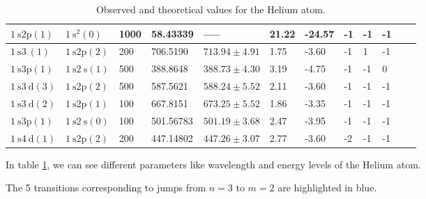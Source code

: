 \begin{table}
\begin{adjustwidth}{-1cm}{-1cm}
\begin{adjustbox}{width=1.75\textwidth, center}
\begin{tabular}{|l|l|l|l|l|l|l|l|l|l|l|l|}
                \hline $1 \mathrm{~s} 2 \mathrm{p}(1)$                      & $1 \mathrm{~s}^2(0)$             & 1000               & 58.43339                                  & -----                            & 21.22                         & -24.57                        & -1                 & -1                 & -1 \\
                \hline \cellcolor{blue!25} $1 \mathrm{~s} 3 \mathrm{~}(1)$  & $1 \mathrm{~s} 2 \mathrm{p}(2)$  & 200                & 706.5190                                  & $713.94 \pm 4.91$                & 1.75                          & -3.60                         & -1                 & 1                  & -1 \\
                \hline \cellcolor{blue!25}  $1 \mathrm{~s} 3 \mathrm{p}(1)$ & $1 \mathrm{~s} 2 \mathrm{~s}(1)$ & 500                & 388.8648                                  & $388.73 \pm 4.30$                & 3.19                          & -4.75                         & -1                 & -1                 & 0  \\
                \hline \cellcolor{blue!25} $1 \mathrm{~s} 3 \mathrm{~d}(3)$ & $1 \mathrm{~s} 2 \mathrm{p}(2)$  & 500                & 587.5621                                  & $588.24 \pm 5.52$                & 2.11                          & -3.60                         & -1                 & -1                 & -1 \\
                \hline \cellcolor{blue!25} $1 \mathrm{~s} 3 \mathrm{~d}(2)$ & $1 \mathrm{~s} 2 \mathrm{p}(1)$  & 100                & 667.8151                                  & $673.25 \pm 5.52$                & 1.86                          & -3.35                         & -1                 & -1                 & -1 \\
                \hline \cellcolor{blue!25} $1 \mathrm{~s} 3 \mathrm{p}(1)$  & $1 \mathrm{~s} 2 \mathrm{~s}(0)$ & 100                & 501.56783                                 & $501.19 \pm 3.68$                & 2.47                          & -3.95                         & -1                 & -1                 & -1 \\
                \hline $1 \mathrm{~s} 4 \mathrm{~d}(1)$                     & $1 \mathrm{~s} 2 \mathrm{p}(2)$  & 200                & 447.14802                                 & $447.26 \pm 3.07$                & 2.77                          & -3.60                         & -2                 & -1                 & -1 \\
                \hline
            \end{tabular}

        \end{adjustbox}

    \end{adjustwidth}
    \caption{Observed and theoretical values for the Helium atom.}
    \label{tab:heliumSpectra}
\end{table}

In table \ref{tab:heliumSpectra}, we can see different parameters like wavelength and energy levels of the Helium atom.

The 5 transitions corresponding to jumps from $n = 3$ to $m = 2$ are highlighted in {\colorbox{blue!25} {blue}}.
